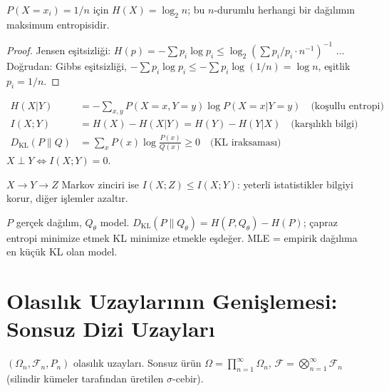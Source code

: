 \begin{teorem}\label{thm:maks_entropi}
$P(X=x_i)=1/n$ için $H(X)=\log_2 n$; bu $n$-durumlu herhangi bir dağılımın maksimum entropisidir.
\end{teorem}

\begin{proof}
Jensen eşitsizliği: $H(p)=-\sum p_i\log p_i\leq\log_2(\sum p_i/p_i \cdot n^{-1})^{-1}$ ... Doğrudan: Gibbs eşitsizliği, $-\sum p_i\log p_i\leq-\sum p_i\log(1/n)=\log n$, eşitlik $p_i=1/n$.
\end{proof}

\begin{tanim}\label{def:karsılikli_bilgi}
\begin{align*}
  H(X|Y) &= -\sum_{x,y}P(X=x,Y=y)\log P(X=x|Y=y) \quad \text{(koşullu entropi)}\\
  I(X;Y) &= H(X)-H(X|Y) = H(Y)-H(Y|X) \quad \text{(karşılıklı bilgi)}\\
  D_{\mathrm{KL}}(P\|Q) &= \sum_x P(x)\log\frac{P(x)}{Q(x)} \geq 0 \quad \text{(KL iraksaması)}
\end{align*}
$X\perp Y\iff I(X;Y)=0$.
\end{tanim}

\begin{teorem}\label{thm:veri_isleme}
$X\to Y\to Z$ Markov zinciri ise $I(X;Z)\leq I(X;Y)$: yeterli istatistikler bilgiyi korur, diğer işlemler azaltır.
\end{teorem}

\begin{ornek}\label{ex:kl_olasilik}
$P$ gerçek dağılım, $Q_\theta$ model. $D_{\mathrm{KL}}(P\|Q_\theta)=H(P,Q_\theta)-H(P)$; çapraz entropi minimize etmek KL minimize etmekle eşdeğer. MLE = empirik dağılıma en küçük KL olan model.
\end{ornek}

\section{Olasılık Uzaylarının Genişlemesi: Sonsuz Dizi Uzayları}
\label{sec:sonsuz_uzay}

\begin{tanim}\label{def:urun_uzayi}
$(\Omega_n,\mathcal{F}_n,P_n)$ olasılık uzayları. Sonsuz ürün $\Omega=\prod_{n=1}^\infty\Omega_n$, $\mathcal{F}=\bigotimes_{n=1}^\infty\mathcal{F}_n$ (silindir kümeler tarafından üretilen $\sigma$-cebir).
\end{tanim}

